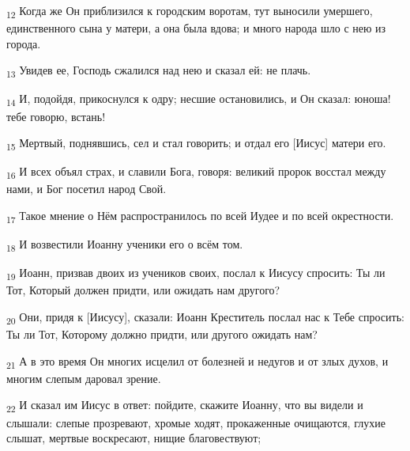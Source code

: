 \begin{tcolorbox}
\textsubscript{12} Когда же Он приблизился к городским воротам, тут выносили умершего, единственного сына у матери, а она была вдова; и много народа шло с нею из города.
\end{tcolorbox}
\begin{tcolorbox}
\textsubscript{13} Увидев ее, Господь сжалился над нею и сказал ей: не плачь.
\end{tcolorbox}
\begin{tcolorbox}
\textsubscript{14} И, подойдя, прикоснулся к одру; несшие остановились, и Он сказал: юноша! тебе говорю, встань!
\end{tcolorbox}
\begin{tcolorbox}
\textsubscript{15} Мертвый, поднявшись, сел и стал говорить; и отдал его [Иисус] матери его.
\end{tcolorbox}
\begin{tcolorbox}
\textsubscript{16} И всех объял страх, и славили Бога, говоря: великий пророк восстал между нами, и Бог посетил народ Свой.
\end{tcolorbox}
\begin{tcolorbox}
\textsubscript{17} Такое мнение о Нём распространилось по всей Иудее и по всей окрестности.
\end{tcolorbox}
\begin{tcolorbox}
\textsubscript{18} И возвестили Иоанну ученики его о всём том.
\end{tcolorbox}
\begin{tcolorbox}
\textsubscript{19} Иоанн, призвав двоих из учеников своих, послал к Иисусу спросить: Ты ли Тот, Который должен придти, или ожидать нам другого?
\end{tcolorbox}
\begin{tcolorbox}
\textsubscript{20} Они, придя к [Иисусу], сказали: Иоанн Креститель послал нас к Тебе спросить: Ты ли Тот, Которому должно придти, или другого ожидать нам?
\end{tcolorbox}
\begin{tcolorbox}
\textsubscript{21} А в это время Он многих исцелил от болезней и недугов и от злых духов, и многим слепым даровал зрение.
\end{tcolorbox}
\begin{tcolorbox}
\textsubscript{22} И сказал им Иисус в ответ: пойдите, скажите Иоанну, что вы видели и слышали: слепые прозревают, хромые ходят, прокаженные очищаются, глухие слышат, мертвые воскресают, нищие благовествуют;
\end{tcolorbox}

